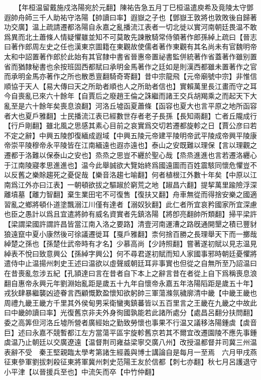 　　【年桓温留戴施戍洛陽宛於元翻】陳祐告急五月丁巳桓温遣庾希及竟陵太守鄧遐帥舟師三千人助祐守洛陽【帥讀曰率】遐嶽之子也【鄧嶽王敦將也敦敗後自歸著功交廣】温上疏請遷都洛陽自永嘉之亂播流江表者一切北徙以實河南朝廷畏温不敢爲異而北土蕭條人情疑懼雖並知不可莫敢先諫散騎常侍領著作郎孫綽上疏曰【晉志曰著作郎周左史之任也漢東京圖籍在東觀故使儒者著作東觀有其名尚未有官魏明帝太和中詔置著作郎於此始有其官隸中書省晉惠帝置祕書監併統著作省蓋著作雖别置省而猶隸秘書也余按班固西都賦曰承明金馬著作之廷如是則漢西都雖未置著作之官而承明金馬亦著作之所也散悉亶翻騎奇寄翻】昔中宗龍飛【元帝廟號中宗】非惟信順協于天人【易大傳曰天之所助者順也人之所助者信也】實賴萬里長江畫而守之耳今自喪亂已來六十餘年【自賈后之廢趙王倫之誅繼而諸王交兵胡羯乘之而起天下大亂至是六十餘年矣喪息浪翻】河洛丘墟函夏蕭條【函容也夏大也言平原之地所函容者大也夏戶雅翻】士民播流江表已經數世存者老子長孫【長知兩翻】亡者丘隴成行【行戶剛翻】雖北風之思感其素心目前之哀實爲交切若遷都旋軫之日【賈公彦曰若不定之辭】中興五陵卽復緬成遐域【中興五陵元帝建平陵明帝武平陵成帝興平陵康帝崇平陵穆帝永平陵皆在江南緬遠也遐亦遠也】泰山之安既難以理保【言以理觀之遷都于洛難以保泰山之安也】烝烝之思豈不纒於聖心哉【烝烝進進也言若遷洛纒心于江南陵寢孝思進進也】温今此舉誠欲大覽始終爲國遠圖而百姓震駭同懷危懼豈不以反舊之樂賖趨死之憂促哉【樂音洛趨七喻翻】何者植根江外數十年矣【中原以江南爲江外亦曰江表】一朝頓欲拔之驅踧於窮荒之地【踧昌六翻】提挈萬里踰險浮深離墳墓【離力智翻】棄生業田宅不可復售【復扶又翻】舟車無從而得捨安樂之國適習亂之鄉將頓仆道塗飄溺江川僅有達者【溺奴狄翻】此仁者所宜哀矜國家所宜深慮也臣之愚計以爲且宜遣將帥有威名資實者先鎮洛陽【將卽亮翻帥所類翻】掃平梁許【梁謂梁國許謂許昌皆當江南入洛之要路】清壹河南運漕之路旣通開墾之積已豐豺狼遠竄中夏小康然後可徐議遷徙耳【戛戶雅翻】柰何捨百勝之長理舉天下而一擲哉綽楚之孫也【孫楚仕武帝時有才名】少慕高尚【少詩照翻】嘗著遂初賦以見志温見綽表不悅曰致意興公【孫綽字興公】何不尋君遂初賦而知人家國事邪時朝廷憂懼將遣侍中止温揚州刺史王述曰温欲以虛聲威朝廷耳非事實也但從之自無所至乃詔温曰在昔喪亂忽涉五紀【孔頴達曰言在昔者自下本上之辭言昔在者從上自下爲稱喪息浪翻自惠帝永興元年劉淵始亂距是歲五十九年自懷帝永嘉五年洛陽䧟距是歲五十年】戎狄肆暴繼襲凶迹眷言西顧慨歎盈懷知欲躬帥三軍蕩滌氛穢廓清中畿【中畿王畿也周禮九畿王畿方千里其外侯甸男采衛蠻夷鎮蕃皆以五百里言之王畿在九畿之中故此曰中畿帥讀曰率】光復舊京非夫外身徇國孰能若此諸所處分【處昌呂翻分扶問翻】委之高筭但河洛丘墟所營者廣經始之勤致勞懷也事果不行温又議移洛陽鍾虡【虡音巨】述曰永嘉不競暫都江左方當蕩平區宇旋軫舊京若其不爾宜改遷園陵不應先事鍾虡温乃止朝廷以交廣遼遠【温督荆司雍益梁寧交廣八州】改授温都督并司冀三州温表辭不受　秦王堅親臨太學考第諸生經義與博士講論自是每月一至焉　六月甲戌燕征東參軍劉拔刺殺征東將軍冀州刺史范陽王友於信都【刺七亦翻】秋七月呂護退守小平津【以晉援兵至也】中流矢而卒【中竹仲翻】

